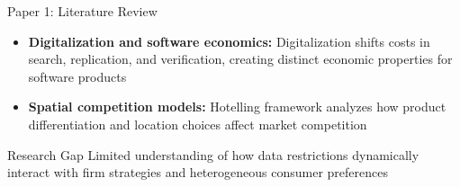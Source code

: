 \documentclass[10pt,aspectratio=169]{beamer}
\begin{document}
\begin{frame}{Paper 1: Literature Review}
\begin{itemize}
    
    \item \textbf{Digitalization and software economics:} Digitalization shifts costs in search, replication, and verification, creating distinct economic properties for software products \citep{Goldfarb2017DigitalEconomics, Dawid2022SmartIntroduction}
    
    \vspace{2mm}
    \item \textbf{Spatial competition models:} Hotelling framework analyzes how product differentiation and location choices affect market competition \citep{Hotelling1929StabilityCompetition, Guo2015AProduction}
    
\end{itemize}

\vspace{1mm}
\begin{block}{Research Gap}
Limited understanding of how data restrictions dynamically interact with firm strategies and heterogeneous consumer preferences
\end{block}
\end{frame}
\end{document}
